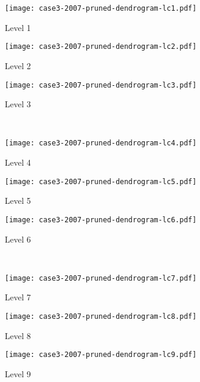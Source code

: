 \begin{appendices}
\clearpage


\begin{figure}[!ht] \centering
	\captionsetup[subfigure]{width=2.0in}
	\begin{subfigure}[t]{0.32\textwidth}
		\texttt{[image: case3-2007-pruned-dendrogram-lc1.pdf]}
		\caption{Level 1}
	\end{subfigure}
	\begin{subfigure}[t]{0.32\textwidth}
		\texttt{[image: case3-2007-pruned-dendrogram-lc2.pdf]}
		\caption{Level 2}
	\end{subfigure}
	\begin{subfigure}[t]{0.32\textwidth}
		\texttt{[image: case3-2007-pruned-dendrogram-lc3.pdf]}
		\caption{Level 3}
	\end{subfigure}\\
	\vspace{5pt}
	\begin{subfigure}[t]{0.32\textwidth}
		\texttt{[image: case3-2007-pruned-dendrogram-lc4.pdf]}
		\caption{Level 4}
	\end{subfigure}
	\begin{subfigure}[t]{0.32\textwidth}
		\texttt{[image: case3-2007-pruned-dendrogram-lc5.pdf]}
		\caption{Level 5}
	\end{subfigure}
	\begin{subfigure}[t]{0.32\textwidth}
		\texttt{[image: case3-2007-pruned-dendrogram-lc6.pdf]}
		\caption{Level 6}
	\end{subfigure}\\
	\vspace{5pt}	
	\begin{subfigure}[t]{0.32\textwidth}
		\texttt{[image: case3-2007-pruned-dendrogram-lc7.pdf]}
		\caption{Level 7}
	\end{subfigure}
	\begin{subfigure}[t]{0.32\textwidth}
		\texttt{[image: case3-2007-pruned-dendrogram-lc8.pdf]}
		\caption{Level 8}
	\end{subfigure}
	\begin{subfigure}[t]{0.32\textwidth}
		\texttt{[image: case3-2007-pruned-dendrogram-lc9.pdf]}
		\caption{Level 9}
	\end{subfigure}\\
	\vspace{5pt}
	\begin{subfigure}[t]{0.32\textwidth}

\end{subfigure}
\end{figure}
\end{appendices}
